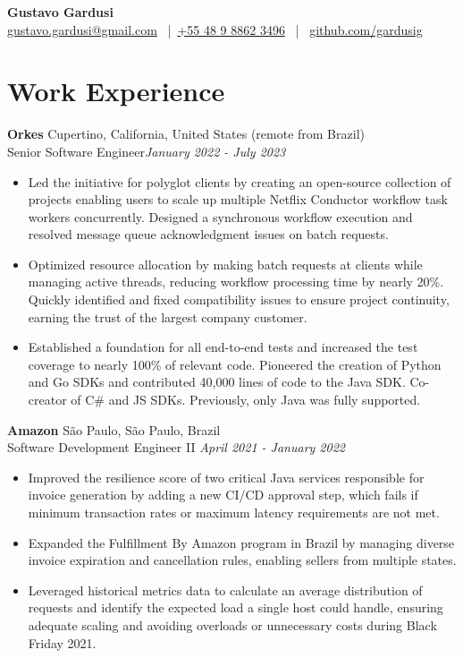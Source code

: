 \documentclass[a4paper,10pt]{article}
\begin{document}
\begin{center}
    {\LARGE \textbf{Gustavo Gardusi}}\\
    \vspace{1em}
    \href{mailto:gustavo.gardusi@gmail.com}{gustavo.gardusi@gmail.com} \, | \,\href{tel:+55488988623496}{+55 48 9 8862 3496} \, | \,   \href{https://github.com/gardusig}{github.com/gardusig}
\end{center}

\section*{Work Experience}

\textbf{Orkes} \hfill Cupertino, California, United States (remote from Brazil) \\
Senior Software Engineer\hfill \textit{January 2022 - July 2023}
\begin{itemize}
    \item Led the initiative for polyglot clients by creating an open-source collection of projects enabling users to scale up multiple Netflix Conductor workflow task workers concurrently. Designed a synchronous workflow execution and resolved message queue acknowledgment issues on batch requests.
    \item Optimized resource allocation by making batch requests at clients while managing active threads, reducing workflow processing time by nearly 20\%. Quickly identified and fixed compatibility issues to ensure project continuity, earning the trust of the largest company customer.
    \item Established a foundation for all end-to-end tests and increased the test coverage to nearly 100\% of relevant code. Pioneered the creation of Python and Go SDKs and contributed 40,000 lines of code to the Java SDK. Co-creator of C\# and JS SDKs. Previously, only Java was fully supported.
\end{itemize}

\textbf{Amazon} \hfill São Paulo, São Paulo, Brazil \\
Software Development Engineer II \hfill \textit{April 2021 - January 2022}
\begin{itemize}
    \item Improved the resilience score of two critical Java services responsible for invoice generation by adding a new CI/CD approval step, which fails if minimum transaction rates or maximum latency requirements are not met.
    \item Expanded the Fulfillment By Amazon program in Brazil by managing diverse invoice expiration and cancellation rules, enabling sellers from multiple states.
    \item Leveraged historical metrics data to calculate an average distribution of requests and identify the expected load a single host could handle, ensuring adequate scaling and avoiding overloads or unnecessary costs during Black Friday 2021.
\end{itemize}
\end{document}
